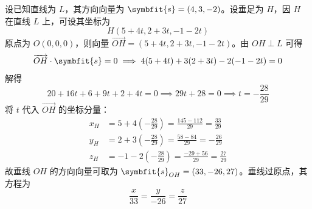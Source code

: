 \begin{solution}
    设已知直线为 $L$，其方向向量为 $\symbfit{s} = (4, 3, -2)$。设垂足为 $H$，因 $H$ 在直线 $L$ 上，可设其坐标为
    \begin{equation}
        H(5 + 4t, 2 + 3t, -1 - 2t)
    \end{equation}
    原点为 $O(0, 0, 0)$，则向量 $\overrightarrow{OH} = (5 + 4t, 2 + 3t, -1 - 2t)$。由 $OH \perp L$ 可得
    \begin{equation}
        \overrightarrow{OH} \cdot \symbfit{s} = 0 \implies 4(5 + 4t) + 3(2 + 3t) - 2(-1 - 2t) = 0
    \end{equation}
    解得
    \begin{equation}
        20 + 16t + 6 + 9t + 2 + 4t = 0 \implies 29t + 28 = 0 \implies t = -\frac{28}{29}
    \end{equation}
    将 $t$ 代入 $\overrightarrow{OH}$ 的坐标分量：
    \begin{equation}
        \begin{aligned}
            x_H & = 5 + 4\left(-\frac{28}{29}\right) = \frac{145 - 112}{29} = \frac{33}{29} \\
            y_H & = 2 + 3\left(-\frac{28}{29}\right) = \frac{58 - 84}{29} = -\frac{26}{29}  \\
            z_H & = -1 - 2\left(-\frac{28}{29}\right) = \frac{-29 + 56}{29} = \frac{27}{29}
        \end{aligned}
    \end{equation}
    故垂线 $OH$ 的方向向量可取为 $\symbfit{s}_{OH} = (33, -26, 27)$。垂线过原点，其方程为
    \begin{equation}
        \boxed{\frac{x}{33} = \frac{y}{-26} = \frac{z}{27}}
    \end{equation}
\end{solution}

\endinput
